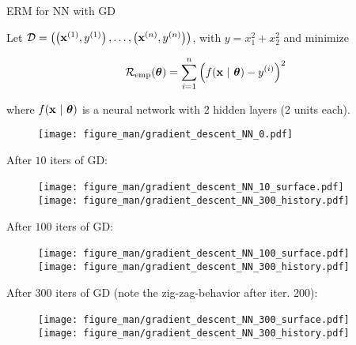 \documentclass[11pt,compress,t,notes=noshow, xcolor=table]{beamer}
\begin{document}
\begin{vbframe}{ERM for NN with GD}

Let $\mathcal{D} = \left( \left(\mathbf{x}^{(1)}, y^{(1)}\right), \ldots, \left(\mathbf{x}^{(n)}, y^{(n)}\right)\right)$, with $y = x_1^2 + x_2^2$ and minimize 

\vspace*{-0.3cm}

$$
	\mathcal{R}_{\text{emp}}(\bm{\theta}) = \sum\limits_{i=1}^n \left(f(\mathbf{x} ~|~ \bm{\theta}) - y^{(i)}\right)^2
$$

\vspace*{-0.1cm}

where $f(\mathbf{x} ~|~ \bm{\theta})$ is a neural network with 2 hidden layers (2 units each). 

\vspace*{-1.5cm}

\begin{figure}
	\texttt{[image: figure\_man/gradient\_descent\_NN\_0.pdf]}
\end{figure}

\framebreak 

After $10$ iters of GD: 

\begin{figure}
	\texttt{[image: figure\_man/gradient\_descent\_NN\_10\_surface.pdf]} ~~ \texttt{[image: figure\_man/gradient\_descent\_NN\_300\_history.pdf]}
\end{figure}

\framebreak 

After $100$ iters of GD: 

\begin{figure}
	\texttt{[image: figure\_man/gradient\_descent\_NN\_100\_surface.pdf]} ~~ \texttt{[image: figure\_man/gradient\_descent\_NN\_300\_history.pdf]}
\end{figure}

\framebreak 

After $300$ iters of GD (note the zig-zag-behavior after iter. 200):

\begin{figure}
	\texttt{[image: figure\_man/gradient\_descent\_NN\_300\_surface.pdf]} ~~ \texttt{[image: figure\_man/gradient\_descent\_NN\_300\_history.pdf]}
\end{figure}
\end{vbframe}
\end{document}

